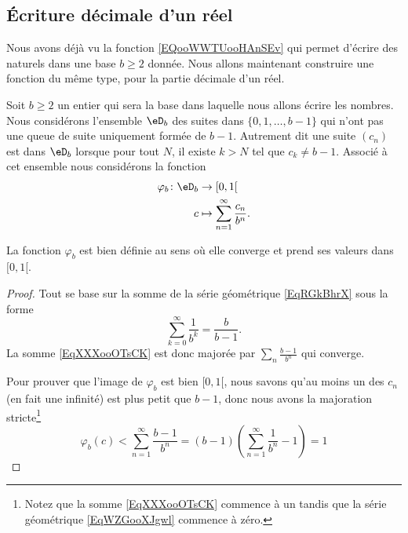 \subsection{Écriture décimale d'un réel}

Nous avons déjà vu la fonction \eqref{EQooWWTUooHAnSEv} qui permet d'écrire des naturels dans une base \( b\geq 2\) donnée. Nous allons maintenant construire une fonction du même type, pour la partie décimale d'un réel.

\begin{normaltext}      \label{NORMALooTZWYooPMgOIm}
	Soit \( b\geq 2\) un entier qui sera la base dans laquelle nous allons écrire les nombres. Nous considérons l'ensemble \( \eD_b\) des suites dans \( \{ 0,1,\ldots, b-1 \}\) qui n'ont pas une queue de suite uniquement formée de \( b-1\). Autrement dit une suite \( (c_n)\) est dans \( \eD_b\) lorsque pour tout \( N\), il existe \( k>N\) tel que \( c_k\neq b-1\). Associé à cet ensemble nous considérons la fonction
	\begin{equation}    \label{EqXXXooOTsCK}
		\begin{aligned}
			\varphi_b\colon \eD_b & \to \mathopen[ 0 , 1 [                          \\
			c                     & \mapsto \sum_{n=1}^{\infty}\frac{ c_n }{ b^n }.
		\end{aligned}
	\end{equation}
\end{normaltext}

\begin{lemma}
	La fonction \( \varphi_b\) est bien définie au sens où elle converge et prend ses valeurs dans \( \mathopen[ 0 , 1 [\).
\end{lemma}

\begin{proof}
	Tout se base sur la somme de la série géométrique \eqref{EqRGkBhrX} sous la forme
	\begin{equation}    \label{EqWZGooXJgwl}
		\sum_{k=0}^{\infty}\frac{1}{ b^k }=\frac{ b }{ b-1 }.
	\end{equation}
	La somme \eqref{EqXXXooOTsCK} est donc majorée par \( \sum_n\frac{ b-1 }{ b^n }\) qui converge.

	Pour prouver que l'image de \( \varphi_b\) est bien \( \mathopen[ 0 , 1 [\), nous savons qu'au moins un des \( c_n\) (en fait une infinité) est plus petit que \( b-1\), donc nous avons la majoration stricte\footnote{Notez que la somme \eqref{EqXXXooOTsCK} commence à un tandis que la série géométrique \eqref{EqWZGooXJgwl} commence à zéro.}
	\begin{equation}
		\varphi_b(c)<\sum_{n=1}^{\infty}\frac{ b-1 }{ b^n }=(b-1)\left( \sum_{n=1}^{\infty}\frac{1}{ b^n }-1 \right)=1
	\end{equation}
\end{proof}

